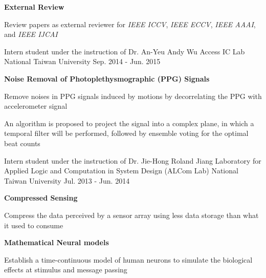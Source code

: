 \documentclass[12pt, a4paper]{awesome-cv}
\begin{document}
\begin{cventries}
{\begin{cvitems}
        \item{\bfseries External Review}
            \begin{cvitems}
            \item{Review papers as external reviewer for \emph{IEEE ICCV}, \emph{IEEE ECCV}, \emph{IEEE AAAI}, and \emph{IEEE IJCAI}}
            \end{cvitems}
        \end{cvitems}
    }
    \cventry
    {Intern student under the instruction of Dr. An-Yeu Andy Wu}
    {Access IC Lab}
    {National Taiwan University}
    {Sep. 2014 - Jun. 2015}
    {
        \begin{cvitems}
        \item{\bfseries Noise Removal of Photoplethysmographic (PPG) Signals}
            \begin{cvitems}
            \item{Remove noises in PPG signals induced by motions by decorrelating the PPG with accelerometer signal}
            \item{An algorithm is proposed to project the signal into a complex plane, in which a temporal filter will be performed, followed by ensemble voting for the optimal beat counts}
            \end{cvitems}
        \end{cvitems}
    }
    \cventry
    {Intern student under the instruction of Dr. Jie-Hong Roland Jiang}
    {Laboratory for Applied Logic and Computation in System Design (ALCom Lab)}
    {National Taiwan University}
    {Jul. 2013 - Jun. 2014}
    {
        \begin{cvitems}
        \item{\bfseries Compressed Sensing}
            \begin{cvitems}
            \item{Compress the data perceived by a sensor array using less data storage than what it used to consume}
            \end{cvitems}
        \item{\bfseries Mathematical Neural models}
            \begin{cvitems}
            \item{Establish a time-continuous model of human neurons to simulate the biological effects at stimulus and message passing}
            \end{cvitems}
        \end{cvitems}
    }
\end{cventries}
\vspace{-5mm}
\end{document}
